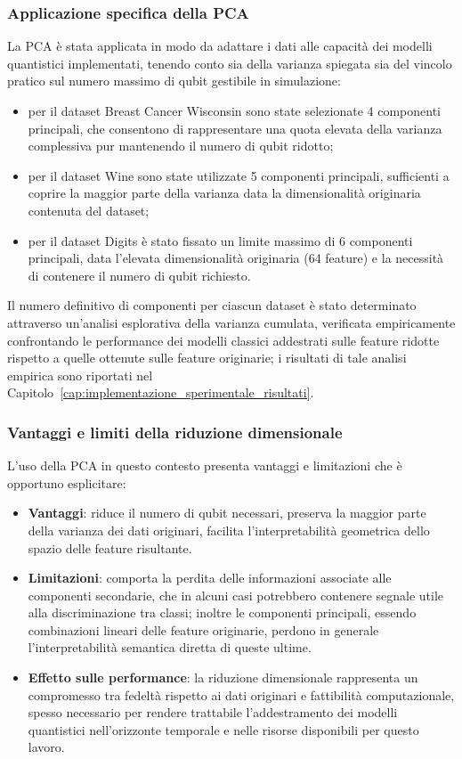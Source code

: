 \subsubsection{Applicazione specifica della PCA}
La PCA è stata applicata in modo da adattare i dati alle capacità dei modelli quantistici implementati, tenendo conto sia della varianza spiegata sia del vincolo pratico sul numero massimo di qubit gestibile in simulazione:
\begin{itemize}
    \item per il dataset Breast Cancer Wisconsin sono state selezionate 4 componenti principali, che consentono di rappresentare una quota elevata della varianza complessiva pur mantenendo il numero di qubit ridotto;
    \item per il dataset Wine sono state utilizzate 5 componenti principali, sufficienti a coprire la maggior parte della varianza data la dimensionalità originaria contenuta del dataset;
    \item per il dataset Digits è stato fissato un limite massimo di 6 componenti principali, data l'elevata dimensionalità originaria (64 feature) e la necessità di contenere il numero di qubit richiesto.
\end{itemize}

Il numero definitivo di componenti per ciascun dataset è stato determinato attraverso un'analisi esplorativa della varianza cumulata, verificata empiricamente confrontando le performance dei modelli classici addestrati sulle feature ridotte rispetto a quelle ottenute sulle feature originarie; i risultati di tale analisi empirica sono riportati nel Capitolo~\ref{cap:implementazione_sperimentale_risultati}.

\subsubsection{Vantaggi e limiti della riduzione dimensionale}
L'uso della PCA in questo contesto presenta vantaggi e limitazioni che è opportuno esplicitare:
\begin{itemize}
    \item \textbf{Vantaggi}: riduce il numero di qubit necessari, preserva la maggior parte della varianza dei dati originari, facilita l'interpretabilità geometrica dello spazio delle feature risultante.
    \item \textbf{Limitazioni}: comporta la perdita delle informazioni associate alle componenti secondarie, che in alcuni casi potrebbero contenere segnale utile alla discriminazione tra classi; inoltre le componenti principali, essendo combinazioni lineari delle feature originarie, perdono in generale l'interpretabilità semantica diretta di queste ultime.
    \item \textbf{Effetto sulle performance}: la riduzione dimensionale rappresenta un compromesso tra fedeltà rispetto ai dati originari e fattibilità computazionale, spesso necessario per rendere trattabile l'addestramento dei modelli quantistici nell'orizzonte temporale e nelle risorse disponibili per questo lavoro.
\end{itemize}

